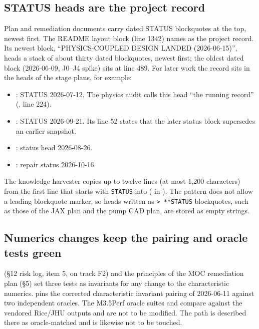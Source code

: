 \subsection{STATUS heads are the project record}
Plan and remediation documents carry dated STATUS blockquotes at the top, newest first. The README layout block (line 1342) names  as the project record. Its newest block, ``PHYSICS-COUPLED DESIGN LANDED (2026-06-15)'', heads a stack of about thirty dated blockquotes, newest first; the oldest dated block (2026-06-09, J0--J4 spike) sits at line 489. For later work the record sits in the heads of the stage plans, for example:
\begin{itemize}
  \item {}: STATUS 2026-07-12. The physics audit calls this head ``the running record'' (, line 224).
  \item {}: STATUS 2026-09-21. Its line 52 states that the later status block supersedes an earlier snapshot.
  \item {}: status head 2026-08-26.
  \item {}: repair status 2026-10-16.
\end{itemize}
The knowledge harvester copies up to twelve lines (at most 1,200 characters) from the first line that starts with \texttt{STATUS} into  ( in ). The pattern does not allow a leading blockquote marker, so heads written as \texttt{>}~\texttt{**STATUS} blockquotes, such as those of the JAX plan and the pump CAD plan, are stored as empty strings.

\subsection{Numerics changes keep the pairing and oracle tests green}
 (§12 risk log, item 5, on track F2) and the principles of the MOC remediation plan (§5) set three tests as invariants for any change to the characteristic numerics.  pins the corrected characteristic invariant pairing of 2026-06-11 against two independent oracles. The M3.5Perf oracle suites  and  compare against the vendored Rice/JHU outputs and are not to be modified. The  path is described there as oracle-matched and is likewise not to be touched.

